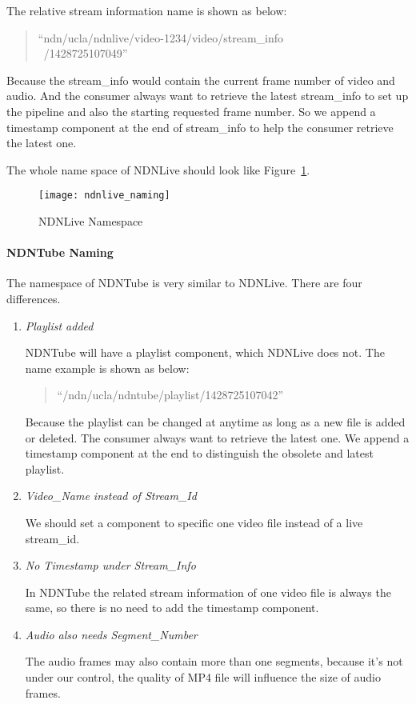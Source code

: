 The relative stream information name is shown as below:
\begin{quote}
``ndn/ucla/ndnlive/video-1234/video/stream\_info \\\ /1428725107049''
\end{quote}

Because the stream\_info would contain the current frame number of video and audio. And the consumer always want to retrieve the latest stream\_info to set up the pipeline and also the starting requested frame number. So we append a timestamp component at the end of stream\_info to help the consumer retrieve the latest one.

The whole name space of NDNLive should look like Figure~\ref{fig:ndnlive_naming}.

\begin{figure}%
  \centering
  \texttt{[image: ndnlive\_naming]}
  \caption{NDNLive Namespace}
  \label{fig:ndnlive_naming}
\end{figure}

\paragraph{NDNTube Naming} %
\label{par:ndntube_naming}

The namespace of NDNTube is very similar to NDNLive. There are four differences.
\begin{enumerate}
	\item{\textit{Playlist added}} 
		
		NDNTube will have a playlist component, which NDNLive does not. The name example is shown as below: 
		\begin{quote}
		``/ndn/ucla/ndntube/playlist/1428725107042''
		\end{quote}
		Because the playlist can be changed at anytime as long as a new file is added or deleted. The consumer always want to retrieve the latest one. We append a timestamp component at the end to distinguish the obsolete and latest playlist.

	\item{\textit{Video\_Name instead of Stream\_Id}} 

		We should set a component to specific one video file instead of a live stream\_id.

	\item{\textit{No Timestamp under Stream\_Info}} 

		In NDNTube the related stream information of one video file is always the same, so there is no need to add the timestamp component.

	\item{\textit{Audio also needs Segment\_Number}} 

		The audio frames may also contain more than one segments, because it's not under our control, the quality of MP4 file will influence the size of audio frames.
\end{enumerate}

